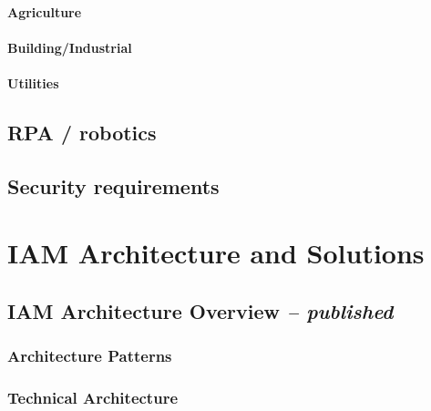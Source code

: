 \hypertarget{agriculture}{%
\subsubsection{Agriculture}\label{agriculture}}

\hypertarget{buildingindustrial}{%
\subsubsection{Building/Industrial}\label{buildingindustrial}}

\hypertarget{utilities}{%
\subsubsection{Utilities}\label{utilities}}

\hypertarget{rpa-robotics}{%
\section{RPA / robotics}\label{rpa-robotics}}

\hypertarget{security-requirements}{%
\section{Security requirements}\label{security-requirements}}

\hypertarget{iam-architecture-and-solutions}{%
\chapter{\texorpdfstring{IAM Architecture and Solutions
}{IAM Architecture and Solutions }}\label{iam-architecture-and-solutions}}

\hypertarget{iam-architecture-overview-published}{%
\section{\texorpdfstring{IAM Architecture Overview \emph{--
published}}{IAM Architecture Overview -- published}}\label{iam-architecture-overview-published}}

\hypertarget{architecture-patterns}{%
\subsection{\texorpdfstring{Architecture Patterns
}{Architecture Patterns }}\label{architecture-patterns}}

\hypertarget{technical-architecture}{%
\subsection{\texorpdfstring{Technical Architecture
}{Technical Architecture }}\label{technical-architecture}}


